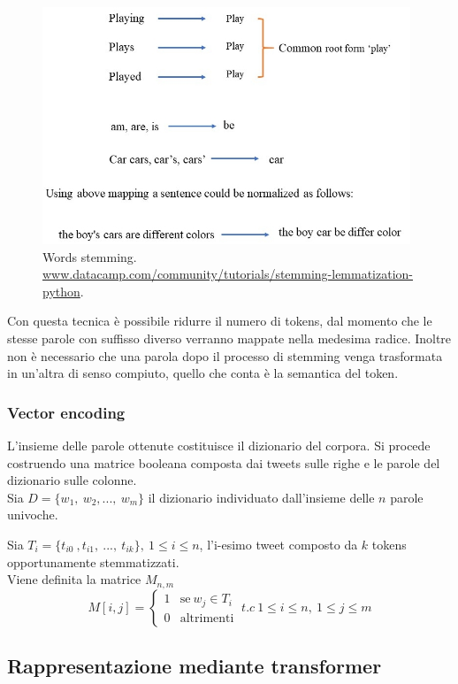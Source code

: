 \documentclass[oneside]{book}
\begin{document}
\begin{figure}[!h]
	\centering
	\includegraphics[width=11cm]{assets/stemming.jpg}
	\caption{Words stemming. \\ \url{www.datacamp.com/community/tutorials/stemming-lemmatization-python}.}
	\label{fig:stemming}
\end{figure}

Con questa tecnica è possibile ridurre il numero di tokens, dal momento che le stesse parole con suffisso diverso verranno mappate nella medesima radice. Inoltre non è necessario che una parola dopo il processo di stemming venga trasformata in un'altra di senso compiuto, quello che conta è la semantica del token.


\subsubsection{Vector encoding}

L'insieme delle parole ottenute costituisce il dizionario del corpora. Si procede costruendo una matrice booleana composta dai tweets sulle righe e le parole del dizionario sulle colonne.\\

Sia $D = \{w_1,\ w_2, ...,\ w_m\}$ il dizionario individuato dall'insieme delle $n$ parole univoche.

Sia $T_i = \{t_{i0}\ ,t_{i1},\ ...,\ t_{ik}\}, \ 1 \leq i \leq n$, l'i-esimo tweet composto da $k$ tokens opportunamente stemmatizzati.\\
Viene definita la matrice $M_{n,m}$
\[
M[i,j] =
\begin{cases}
1 & \text{se}\ w_j \in T_i\\
0 & \text{altrimenti}
\end{cases}
\ t.c\ 1\leq i\leq n,\ 1 \leq j \leq m
\]


\subsection{Rappresentazione mediante transformer}
\end{document}
